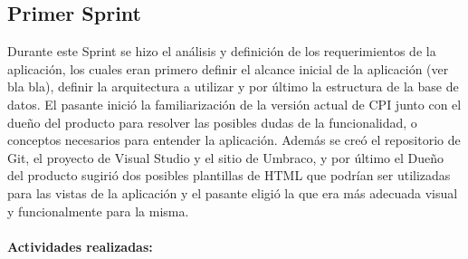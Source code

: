 \subsection{Primer Sprint}
Durante este Sprint se hizo el análisis y definición de los requerimientos de la aplicación, los cuales eran primero definir el alcance inicial de la aplicación (ver bla bla), definir la arquitectura a utilizar y por último la estructura de la base de datos. El pasante inició la familiarización de la versión actual de CPI junto con el dueño del producto para resolver las posibles dudas de la funcionalidad, o conceptos necesarios para entender la aplicación. Además se creó el repositorio de Git, el proyecto de Visual Studio y el sitio de Umbraco, y por último el Dueño del producto sugirió dos posibles plantillas de HTML que podrían ser utilizadas para las vistas de la aplicación y el pasante eligió la que era más adecuada visual y funcionalmente para la misma. 
\\
\\
\textbf{Actividades realizadas:}
